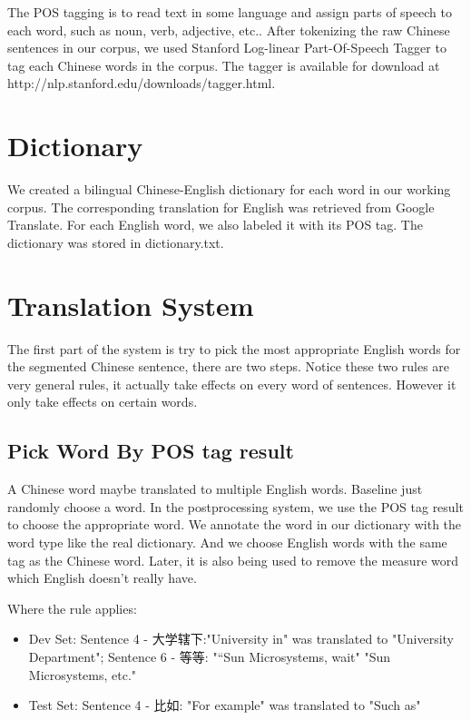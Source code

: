 \documentclass[11pt]{article} %
\begin{document}
\begin{CJK}{UTF8}{gbsn}
The POS tagging is to read text in some language and assign parts of speech to each word, such as noun, verb, adjective, etc.. After tokenizing the raw Chinese sentences in our corpus, we used Stanford Log-linear Part-Of-Speech Tagger to tag each Chinese words in the corpus. The tagger is available for download at http://nlp.stanford.edu/downloads/tagger.html.

\section{Dictionary}
We created a bilingual Chinese-English dictionary for each word in our working corpus. The corresponding translation for English was retrieved from Google Translate. For each English word, we also labeled it with its POS tag. The dictionary was stored in dictionary.txt. 

\section{Translation System}

The first part of the system is try to pick the most appropriate English words for the segmented Chinese sentence, there are two steps. Notice these two rules are very general rules, it actually take effects on every word of sentences. However it only take effects on certain words.

\subsection{Pick Word By POS tag result}
A Chinese word maybe translated to multiple English words. Baseline just randomly choose a word. In the postprocessing system, we use the POS tag result to choose the appropriate word. We annotate the word in our dictionary with the word type like the real dictionary. And we choose English words with the same tag as the Chinese word.
Later, it is also being used to remove the measure word which English doesn't really have.

Where the rule applies:
\begin{itemize}
\item Dev Set: Sentence 4 - 大学辖下:"University in"  was translated to  "University Department"; Sentence 6 - 等等: "“Sun Microsystems, wait" "Sun Microsystems, etc."
\item Test Set: Sentence 4 - 比如: "For example"  was translated to  "Such as"
\end{itemize}


\end{CJK}
\end{document}
